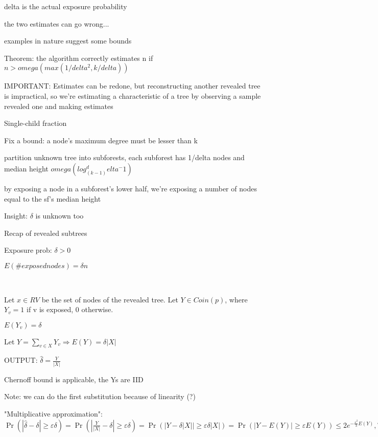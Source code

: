 \documentclass{report}
\begin{document}
	delta is the actual exposure probability
	
	the two estimates can go wrong...
	
	examples in nature suggest some bounds
	
	
	Theorem: the algorithm correctly estimates n if $n > omega(max(1/delta^2, k/delta))$
	
		
		IMPORTANT: Estimates can be redone, but reconstructing another revealed tree is impractical, so we're estimating a characteristic of  a tree by observing a sample revealed one and making estimates
	
	Single-child fraction
	
	Fix a bound: a node's maximum degree must be lesser than k
	
	partition unknown tree into subforests, each subforest has 1/delta nodes and median height $omega(log_(k-1)^delta^-1)$
	
	by exposing a node in a subforest's lower half, we're exposing a number of nodes equal to the sf's median height
	
	
	
	
	Insight: $\delta$ is unknown too
	
	Recap of revealed subtrees
	
	Exposure prob: $\delta > 0$
	
	$E(\# exposed nodes) = \delta n$
	
	\
	
	Let $x \in RV$ be the set of nodes of the revealed tree. Let $Y \in Coin(p)$, where $Y_v = 1$ if v is exposed, 0 otherwise.
	
	$E(Y_v) = \delta$
	
	Let $ Y = \sum_{v \in X} Y_v \Rightarrow E(Y)= \delta |X|$
	
	OUTPUT: $\hat\delta = \frac{Y}{|X|}$
	
	Chernoff bound is applicable, the Ys are IID
	
	Note: we can do the first substitution because of linearity (?)
	
	"Multiplicative approximation": $\displaystyle \Pr(|\hat\delta - \delta| \geq \varepsilon \delta) = \Pr(|\frac{Y}{|X|} - \delta| \geq \varepsilon \delta) = \Pr(|Y - \delta |X|| \geq \varepsilon \delta |X|) = \Pr(|Y - E(Y)| \geq \varepsilon E(Y)) \leq 2e^{-\frac{\varepsilon^2}{3}E(Y)}, \forall \varepsilon \in (0, 1)$
	
\end{document}
